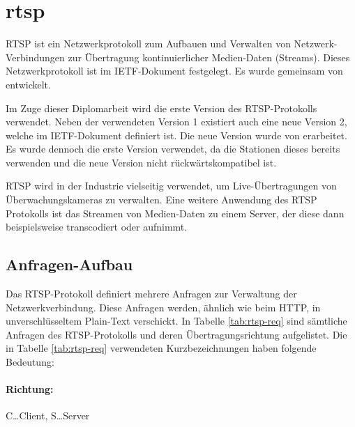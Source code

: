 \section{\acl{rtsp}}
RTSP ist ein Netzwerkprotokoll zum Aufbauen und Verwalten von Netzwerk-Verbindungen zur Übertragung kontinuierlicher Medien-Daten (Streams).
Dieses Netzwerkprotokoll ist im IETF-Dokument  festgelegt. 
Es wurde gemeinsam von \citeauthor{ietf-rtsp} entwickelt. \cite[vgl.][]{ietf-rtsp}\par
Im Zuge dieser Diplomarbeit wird die erste Version des RTSP-Protokolls verwendet.
Neben der verwendeten Version 1 existiert auch eine neue Version 2, welche im IETF-Dokument  definiert ist. Die neue Version wurde von \citeauthor{ietf-rtsp-2} erarbeitet. \cite[vgl.][]{ietf-rtsp-2}
Es wurde dennoch die erste Version verwendet, da die Stationen dieses bereits verwenden und die neue Version nicht rückwärtskompatibel ist.\par

RTSP wird in der Industrie vielseitig verwendet, um Live-Übertragungen von Überwachungskameras zu verwalten. Eine weitere Anwendung des RTSP Protokolls ist das Streamen von Medien-Daten zu einem Server, der diese dann beispielsweise transcodiert oder aufnimmt.

\subsection{Anfragen-Aufbau}
Das RTSP-Protokoll definiert mehrere Anfragen zur Verwaltung der Netzwerkverbindung.
Diese Anfragen werden, ähnlich wie beim HTTP, in unverschlüsseltem Plain-Text verschickt.
In Tabelle \ref{tab:rtsp-req} sind sämtliche Anfragen des RTSP-Protokolls und deren Übertragungsrichtung aufgelistet.
Die in Tabelle \ref{tab:rtsp-req} verwendeten Kurzbezeichnungen haben folgende Bedeutung:
\paragraph{Richtung:} C\dots Client, S\dots Server
